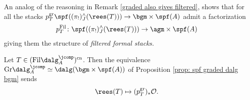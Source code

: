 \documentclass[10pt,reqno]{amsart}
\numberwithin{equation}{section}
\newcommand{\cO}{{\mathcal{O}}}
\newcommand{\Gr}{\mathrm{Gr}}
\newcommand{\fil}{\mathrm{Fil}}
\newcommand{\gr}{\mathrm{gr}}
\newcommand{\cn}{\mathrm{cn}}
\newcommand{\pij}{(\pi_!)^\wedge_J}
\begin{document}
\begin{remark}
    An analog of the reasoning in Remark \ref{graded also gives filtered}, shows that for all the stacks $p_T^\gr \spf(\pij(\rees(T)))\to \bgm\times \spf(A)$ admit a factorization $$p_T^\fil\colon \spf(\pij(\rees(T)))\to \agm\times \spf(A)$$ giving them the structure of \emph{filtered formal stacks.} 
\end{remark}


\begin{proposition}\label{prop: cts algebra sended correctly}
    Let $T\in (\fil\dalg^\jcomp_A)^\cn$. Then the equivalence $\Gr\dalg_A^\jcomp\simeq \dalg(\bgm\times \spf(A))$ of Proposition \ref{prop: spf graded dalg bgm} sends 
    $$\rees(T)\mapsto (p_T^\gr)_*\cO.$$
\end{proposition}
\end{document}
